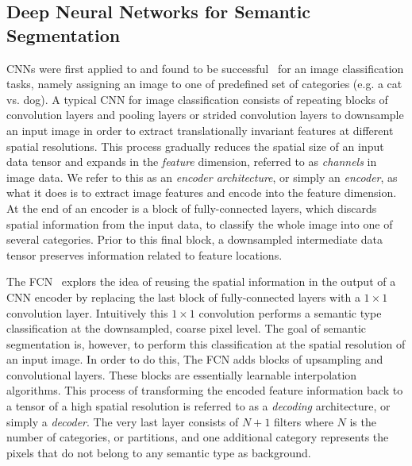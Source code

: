 \documentclass{ws-rv9x6}
\begin{document}
\subsection{Deep Neural Networks for Semantic Segmentation}
CNNs were first applied to and found to be successful~\cite{NIPS2012_4824,simonyan2014deep,szegedy2014going,he2015deep} for an image classification tasks, namely assigning an image to one of predefined set of categories (e.g. a cat vs. dog). A typical CNN for image classification consists of repeating blocks of convolution layers and pooling layers or strided convolution layers to downsample an input image in order to extract translationally invariant features at different spatial resolutions. This process gradually reduces the spatial size of an input data tensor and expands in the {\it feature} dimension, referred to as {\it channels} in image data. We refer to this as an {\it encoder architecture}, or simply an {\it encoder}, as what it does is to extract image features and encode into the feature dimension. At the end of an encoder is a block of fully-connected layers, which discards spatial information from the input data, to classify the whole image into one of several categories. Prior to this final block, a downsampled intermediate data tensor preserves information related to feature locations.

The FCN~\cite{long2014fully} explors the idea of reusing the spatial information in the output of a CNN encoder by replacing the last block of fully-connected layers with a $1\times1$ convolution layer. Intuitively this $1\times1$ convolution performs a semantic type classification at the downsampled, coarse pixel level. The goal of semantic segmentation is, however, to perform this classification at the spatial resolution of an input image. In order to do this, The FCN adds blocks of upsampling and convolutional layers. These blocks are essentially learnable interpolation algorithms. This process of transforming the encoded feature information back to a tensor of a high spatial resolution is referred to as a {\it decoding} architecture, or simply a {\it decoder}. The very last layer consists of $N+1$ filters where $N$ is the number of categories, or partitions, and one additional category represents the pixels that do not belong to any semantic type as background.
\end{document}

